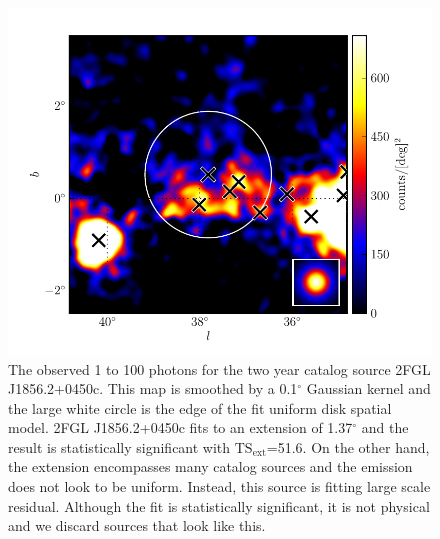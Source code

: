 \documentclass[12pt,preprint]{aastex}
\newcommand{\gev}{\text{GeV}\xspace}
\newcommand{\tsext}{{\ensuremath{\text{TS}_\text{ext}}}\xspace}
\renewcommand{\deg}{\ensuremath{^\circ}\xspace}
\begin{document}
\clearpage
\begin{figure}
  \begin{center}
    \includegraphics{source_plots/example_bad_fit.pdf}
    \caption{
    The observed 1 \gev to 100 \gev photons for the
    two year catalog source 2FGL J1856.2+0450c. This map is smoothed by
    a 0.1\deg Gaussian kernel and the large white circle is the edge of
    the fit uniform disk spatial model.  2FGL J1856.2+0450c fits to an
    extension of 1.37\deg and the result is statistically significant
    with \tsext=51.6. On the other hand, the extension encompasses many
    catalog sources and the emission does not look to be uniform. Instead,
    this source is fitting large scale residual. Although the fit is 
    statistically significant, it is not physical and we discard sources
    that look like this.
    }
    \label{example_bad_fit}
  \end{center}
\end{figure}
\end{document}
